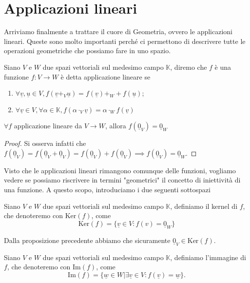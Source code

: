 \section{Applicazioni lineari}
Arriviamo finalmente a trattare il cuore di Geometria, ovvero le applicazioni lineari. Queste sono molto importanti perché ci permettono di descrivere tutte le operazioni geometriche che possiamo fare in uno spazio.
\begin{definition}
  Siano $V$ e $W$ due spazi vettoriali sul medesimo campo $\mathbb{K}$, diremo che $f$ è una funzione $f: V \to W$ è detta applicazione lineare se
  \begin{enumerate}[label=\protect\circled{\arabic*}]
    \item $\forall \underline{v}, \underline{u} \in V, f(\underline{v} +_V \underline{u}) = f(\underline{v}) +_W + f(\underline{u})$;
    \item $\forall \underline{v} \in V, \forall \alpha \in \mathbb{K}, f(\alpha \cdot_V \underline{v}) = \alpha \cdot_W f(\underline{v})$
  \end{enumerate}
\end{definition}
\begin{prop}
$\forall f$ applicazione lineare da $V \to W$, allora $f(\underline{0}_V) = \underline{0}_W$
\end{prop}
\begin{proof}
  Si osserva infatti che $f(\underline{0}_V) = f(\underline{0}_V + \underline{0}_V) = f(\underline{0}_V) + f(\underline{0}_V) \implies f(\underline{0}_V) = \underline{0}_W$.
\end{proof}
Visto che le applicazioni lineari rimangono comunque delle funzioni, vogliamo vedere se possiamo riscrivere in termini "geometrici" il concetto di iniettività di una funzione. A questo scopo, introduciamo i due seguenti sottospazi
\begin{definition}
  Siano $V$ e $W$ due spazi vettoriali sul medesimo campo $\mathbb{K}$, definiamo il kernel di $f$, che denoteremo con $\text{Ker}(f)$, come
  $$
    \text{Ker}(f) = \{ \underline{v} \in V : f(v) = \underline{0}_W \}
  $$
\end{definition}
\begin{remark}
  Dalla proposizione precedente abbiamo che sicuramente $\underline{0}_V \in \text{Ker}(f)$.
\end{remark}
\begin{definition}
  Siano $V$ e $W$ due spazi vettoriali sul medesimo campo $\mathbb{K}$, definiamo l'immagine di $f$, che denoteremo con $\text{Im}(f)$, come
  $$
    \text{Im}(f) = \{ \underline{w} \in W \big| \exists \underline{v} \in V : f(\underline{v}) = \underline{w} \}.
  $$
\end{definition}
